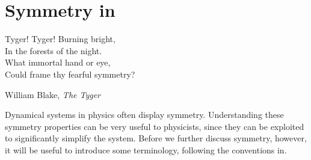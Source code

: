 \chapter{Symmetry in \pCf}	
\epigraph{Tyger! Tyger! Burning bright, \\
		In the forests of the night. \\
		What immortal hand or eye,\\
		Could frame thy fearful symmetry?}{William Blake, \emph{The Tyger}} 


Dynamical systems in physics often display symmetry. Understanding these symmetry properties can be very useful to physicists, since they can be exploited to significantly simplify the system. Before we further discuss symmetry, however, it will be useful to introduce some terminology, following the conventions in.  \\

